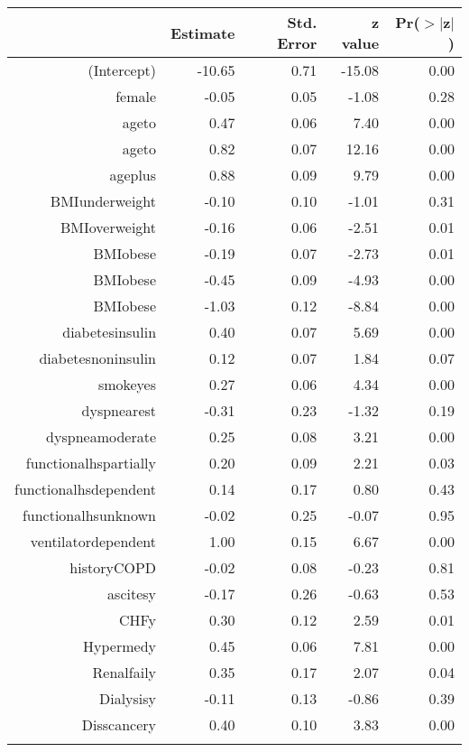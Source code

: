 \bigskip\bigskip
\centering
\begin{tabular}{rrrrr}
  \hline
 & Estimate & Std. Error & z value & Pr($>$$|$z$|$) \\ 
  \hline
(Intercept) & -10.65 & 0.71 & -15.08 & 0.00 \\ 
  female & -0.05 & 0.05 & -1.08 & 0.28 \\ 
  age\-65\-to\-74 & 0.47 & 0.06 & 7.40 & 0.00 \\ 
  age\-75\-to\-84 & 0.82 & 0.07 & 12.16 & 0.00 \\ 
  age\-85\-plus & 0.88 & 0.09 & 9.79 & 0.00 \\ 
  BMI\-underweight & -0.10 & 0.10 & -1.01 & 0.31 \\ 
  BMI\-overweight & -0.16 & 0.06 & -2.51 & 0.01 \\ 
  BMI\-obese\-1 & -0.19 & 0.07 & -2.73 & 0.01 \\ 
  BMI\-obese\-2 & -0.45 & 0.09 & -4.93 & 0.00 \\ 
  BMI\-obese\-3 & -1.03 & 0.12 & -8.84 & 0.00 \\ 
  diabetes\-insulin & 0.40 & 0.07 & 5.69 & 0.00 \\ 
  diabetes\-noninsulin & 0.12 & 0.07 & 1.84 & 0.07 \\ 
  smoke\-yes & 0.27 & 0.06 & 4.34 & 0.00 \\ 
  dyspnea\-rest & -0.31 & 0.23 & -1.32 & 0.19 \\ 
  dyspnea\-moderate & 0.25 & 0.08 & 3.21 & 0.00 \\ 
  functional\-hs\-partially & 0.20 & 0.09 & 2.21 & 0.03 \\ 
  functional\-hs\-dependent & 0.14 & 0.17 & 0.80 & 0.43 \\ 
  functional\-hs\-unknown & -0.02 & 0.25 & -0.07 & 0.95 \\ 
  ventilator\-dependent & 1.00 & 0.15 & 6.67 & 0.00 \\ 
  history\-COPD & -0.02 & 0.08 & -0.23 & 0.81 \\ 
  ascites\-y & -0.17 & 0.26 & -0.63 & 0.53 \\ 
  CHF\-y & 0.30 & 0.12 & 2.59 & 0.01 \\ 
  Hyper\-med\-y & 0.45 & 0.06 & 7.81 & 0.00 \\ 
  Renal\-fail\-y & 0.35 & 0.17 & 2.07 & 0.04 \\ 
  Dialysis\-y & -0.11 & 0.13 & -0.86 & 0.39 \\ 
  Diss\-cancer\-y & 0.40 & 0.10 & 3.83 & 0.00 \\ 
$$
\end{tabular}
